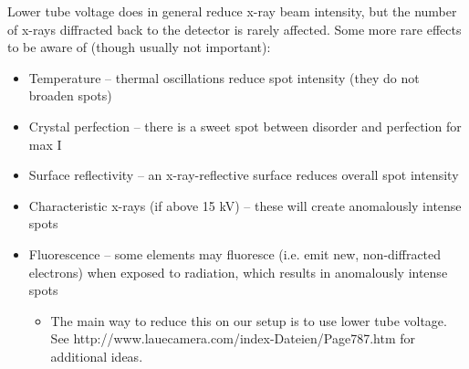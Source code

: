 Lower tube voltage does in general reduce x-ray beam intensity, but the number of x-rays diffracted back to the detector is rarely affected.
Some more rare effects to be aware of (though usually not important):
\begin{itemize}
    \item Temperature – thermal oscillations reduce spot intensity (they do not broaden spots)
    \item Crystal perfection – there is a sweet spot between disorder and perfection for max I
    \item Surface reflectivity – an x-ray-reflective surface reduces overall spot intensity
    \item Characteristic x-rays (if above 15 kV) – these will create anomalously intense spots
    \item Fluorescence – some elements may fluoresce (i.e. emit new, non-diffracted electrons) when exposed to radiation, which results in anomalously intense spots
    \begin{itemize}
        \item The main way to reduce this on our setup is to use lower tube voltage. See http://www.lauecamera.com/index-Dateien/Page787.htm for additional ideas.
        \end{itemize}
\end{itemize}
